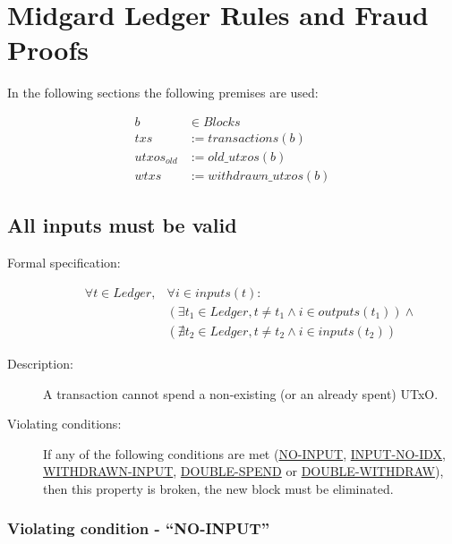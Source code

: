 \documentclass[../main.tex]{subfiles}
\begin{document}
\section{Midgard Ledger Rules and Fraud Proofs}
\label{sec:ledger-rules-fraud-proofs}

In the following sections the following premises are used:

\begin{equation*}
\begin{split}
           b & \in Blocks             \\
         txs & := transactions(b)     \\
 utxos_{old} & := old\_utxos(b)       \\
        wtxs & := withdrawn\_utxos(b)
\end{split}
\end{equation*}

\subsection{All inputs must be valid}

\begin{description}

\item[Formal specification:]
\begin{equation*}
\begin{split}
    \forall t \in Ledger, &\forall i \in inputs(t): \\
    &( \exists t_1 \in Ledger, t \neq t_1 \land i \in outputs(t_1) ) \land \\
    &( \nexists t_2 \in Ledger, t \neq t_2 \land i \in inputs(t_2) )
\end{split}
\end{equation*}

\item[Description:] A transaction cannot spend a non-existing (or an already spent) UTxO.
\item[Violating conditions:] If any of the following conditions are met (\hyperref[sec:NO-INPUT]{NO-INPUT}, \hyperref[sec:INPUT-NO-IDX]{INPUT-NO-IDX}, \hyperref[sec:WITHDRAWN-INPUT]{WITHDRAWN-INPUT}, \hyperref[sec:DOUBLE-SPEND]{DOUBLE-SPEND} or \hyperref[sec:DOUBLE-WITHDRAW]{DOUBLE-WITHDRAW}), then this property is broken, the new block must be eliminated.

\end{description}

\subsubsection{Violating condition - ``NO-INPUT''}
\label{sec:NO-INPUT}
\end{document}
